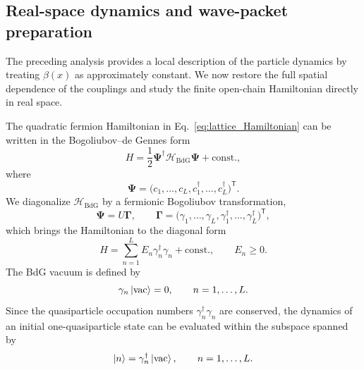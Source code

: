 \documentclass[reprint,amsmath,amssymb,aps,prb,showkeys,superscriptaddress]{revtex4-2}
\begin{document}
\subsection{Real-space dynamics and wave-packet preparation}
\label{subsec:real_space}

The preceding analysis provides a local description of the particle
dynamics by treating $\beta(x)$ as approximately constant. We now
restore the full spatial dependence of the couplings and study the
finite open-chain Hamiltonian directly in real space.

The quadratic fermion Hamiltonian in
Eq.~\eqref{eq:lattice_Hamiltonian} can be written in the
Bogoliubov--de Gennes form
\begin{equation}
  H
  =
  \frac{1}{2}
  \boldsymbol{\Psi}^{\dagger}
  \mathcal{H}_{\mathrm{BdG}}
  \boldsymbol{\Psi}
  +\mathrm{const.},
  \label{eq:real_space_BdG}
\end{equation}
where
\begin{equation}
  \boldsymbol{\Psi}
  =
  \bigl(
    c_1,\ldots,c_L,
    c_1^\dagger,\ldots,c_L^\dagger
  \bigr)^{\mathsf T}.
  \label{eq:real_space_Nambu}
\end{equation}
We diagonalize $\mathcal{H}_{\mathrm{BdG}}$ by a fermionic
Bogoliubov transformation,
\begin{equation}
  \boldsymbol{\Psi}
  =
  U\boldsymbol{\Gamma},
  \qquad
  \boldsymbol{\Gamma}
  =
  \bigl(
    \gamma_1,\ldots,\gamma_L,
    \gamma_1^\dagger,\ldots,\gamma_L^\dagger
  \bigr)^{\mathsf T},
  \label{eq:Bogoliubov_transformation}
\end{equation}
which brings the Hamiltonian to the diagonal form
\begin{equation}
  H
  =
  \sum_{n=1}^{L}
  E_n\gamma_n^\dagger\gamma_n
  +\mathrm{const.},
  \qquad
  E_n\geq0.
  \label{eq:diagonal_Hamiltonian}
\end{equation}
The BdG vacuum is defined by
\begin{equation}
  \gamma_n\ket{\mathrm{vac}}=0,
  \qquad
  n=1,\ldots,L.
  \label{eq:BdG_vacuum}
\end{equation}
Since the quasiparticle occupation numbers
$\gamma_n^\dagger\gamma_n$ are conserved, the dynamics of an
initial one-quasiparticle state can be evaluated within the subspace
spanned by
\begin{equation}
  \ket{n}
  =
  \gamma_n^\dagger\ket{\mathrm{vac}},
  \qquad
  n=1,\ldots,L.
  \label{eq:one_quasiparticle_basis}
\end{equation}
\end{document}
